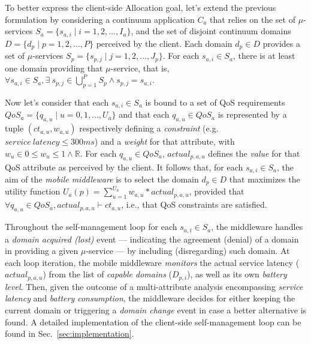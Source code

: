 To better express the client-side Allocation goal, let's extend the previous formulation by considering a continuum application $C_a$ that relies on the set of $\mu$-services $S_a = \{s_{a,i} \mid i = 1,2,...,I_a\}$, and the set of disjoint continuum domains $D = \{d_p \mid p = 1,2,...,P\}$ perceived by the client.
Each domain $d_p \in D$ provides a set of $\mu$-services $S_{p} = \{s_{p,j} \mid j =  1,2,..., J_p\}$. For each $s_{a,i} \in S_a$, there is at least one domain providing that $\mu$-service, that is, $\forall s_{a,i} \in S_a, \exists\ s_{p,j} \in \bigcup_{p=1}^{P} S_p \wedge s_{p,j} = s_{a,i}$. 

Now let's consider that each $s_{a,i} \in S_a$ is bound to a set of QoS requirements $QoS_a = \{q_{a,u} \mid u = 0, 1, ..., U_a\}$ and that each $q_{a,u} \in QoS_a$ is represented by a tuple $(ct_{a,u}, w_{a,u})$ respectively defining a \textit{constraint} (e.g. $service\ latency \le 300ms$) and a \textit{weight} for that attribute, with $w_u \in 0 \le w_u \le 1 \wedge \mathbb{R}$. For each $q_{a,u} \in QoS_a$, $actual_{p,a,u}$ defines the \textit{value} for that QoS attribute as perceived by the client. It follows that, for each $s_{a,i} \in S_a$, the aim of the \textit{mobile middleware} is to select the domain $d_p \in D$ 
that maximizes the utility function $U_a(p) = \sum_{u=1}^{U_a} w_{a,u} * actual_{p,a,u}$, provided that $\forall q_{a,u} \in QoS_a, actual_{p,a,u} \vdash ct_{a,u}$, i.e., that QoS constraints are satisfied.

Throughout the self-management loop for each $s_{a,i} \in S_a$, the middleware handles a \textit{domain acquired (lost)} event --- indicating the agreement (denial) of a domain in providing a given $\mu$-service --- by including (disregarding) such domain. At each loop iteration, the mobile middleware \textit{monitors} the actual service latency ($actual_{p,a,u}$) from the list of \textit{capable domains} ($D_{p,i}$), as well as its own \textit{battery level}. Then, given the outcome of a multi-attribute analysis encompassing \textit{service latency} and \textit{battery consumption}, the middleware decides for either keeping the current domain or triggering a \textit{domain change} event in case a better alternative is found. A detailed implementation of the client-side self-management loop can be found in Sec.~\ref{sec:implementation}.




